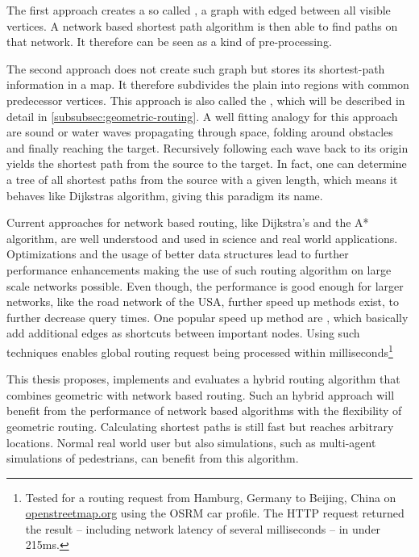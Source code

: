 The first approach creates a so called , a graph with edged between all visible vertices.
A network based shortest path algorithm is then able to find paths on that network\cite[2]{hershberger-suri}.
It therefore can be seen as a kind of pre-processing.

The second approach does not create such graph but stores its shortest-path information in a map.
It therefore subdivides the plain into regions with common predecessor vertices.
This approach is also called the , which will be described in detail in \cref{subsubsec:geometric-routing}.
A well fitting analogy for this approach are sound or water waves propagating through space, folding around obstacles and finally reaching the target.
Recursively following each wave back to its origin yields the shortest path from the source to the target.
In fact, one can determine a tree of all shortest paths from the source with a given length, which means it behaves like Dijkstras algorithm, giving this paradigm its name\cite[648]{mitchell-discrete-geodesic}.

Current approaches for network based routing, like Dijkstra's and the A* algorithm, are well understood and used in science and real world applications.
Optimizations and the usage of better data structures lead to further performance enhancements making the use of such routing algorithm on large scale networks possible.
Even though, the performance is good enough for larger networks, like the road network of the USA\cite[5]{aviram-optimizing-dijkstra}, further speed up methods exist, to further decrease query times.
One popular speed up method are , which basically add additional edges as shortcuts between important nodes\cite{geisberger-contraction-hierarchies}.
Using such techniques enables global routing request being processed within milliseconds\footnote{Tested for a routing request from Hamburg, Germany to Beijing, China on \href{https://www.openstreetmap.org/directions?engine=fossgis\_osrm\_car&route=53.55\%2C10.00\%3B39.91\%2C116.39}{openstreetmap.org} using the OSRM car profile. The HTTP request returned the result -- including network latency of several milliseconds -- in under 215ms.}

This thesis proposes, implements and evaluates a hybrid routing algorithm that combines geometric with network based routing.
Such an hybrid approach will benefit from the performance of network based algorithms with the flexibility of geometric routing.
Calculating shortest paths is still fast but reaches arbitrary locations.
Normal real world user but also simulations, such as multi-agent simulations of pedestrians, can benefit from this algorithm.